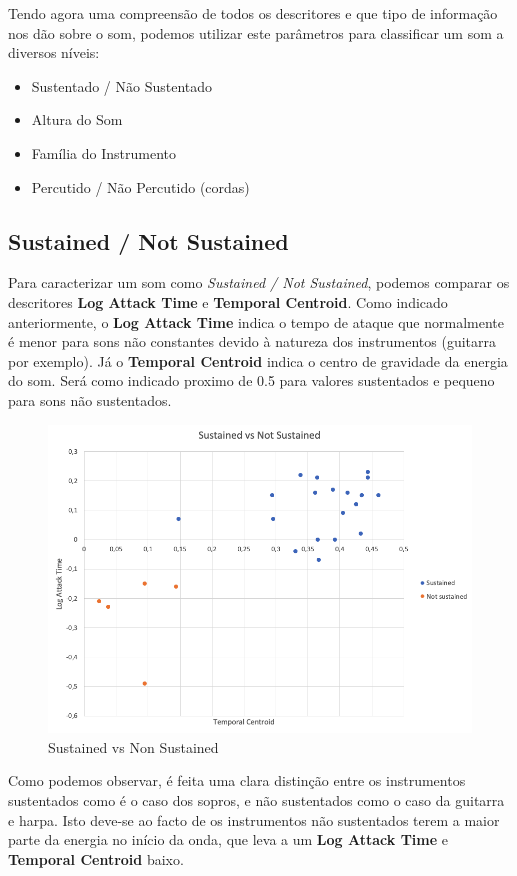 Tendo agora uma compreensão de todos os descritores e que tipo de informação nos dão sobre o som, podemos utilizar este parâmetros para classificar um som a diversos níveis:

\begin{itemize}
    \item Sustentado / Não Sustentado
    \item Altura do Som
    \item Família do Instrumento
    \item Percutido / Não Percutido (cordas)
\end{itemize}


\subsection{Sustained / Not Sustained}

Para caracterizar um som como \textit{Sustained / Not Sustained}, podemos comparar os descritores \textbf{Log Attack Time} e \textbf{Temporal Centroid}.
Como indicado anteriormente, o \textbf{Log Attack Time} indica o tempo de ataque que normalmente é menor para sons não constantes devido à natureza dos instrumentos (guitarra por exemplo).
Já o \textbf{Temporal Centroid} indica o centro de gravidade da energia do som.
Será como indicado proximo de 0.5 para valores sustentados e pequeno para sons não sustentados.

\begin{figure}[H]
    \centering
    \includegraphics[width=.8\linewidth]{figs/temp_cent.png}
    \caption{Sustained vs Non Sustained}
    \label{fig:3}
\end{figure}

Como podemos observar, é feita uma clara distinção entre os instrumentos sustentados como é o caso dos sopros, e não sustentados como o caso da guitarra e harpa.
Isto deve-se ao facto de os instrumentos não sustentados terem a maior parte da energia no início da onda, que leva a um \textbf{Log Attack Time} e \textbf{Temporal Centroid} baixo.



